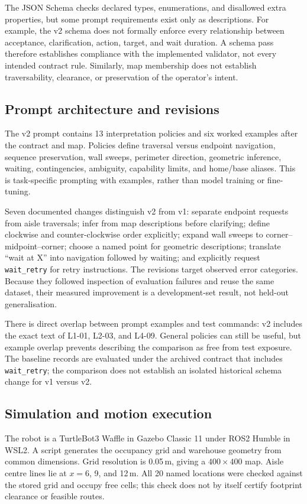 \documentclass[journal]{IEEEtran}
\newcommand{\field}[1]{\texttt{#1}}
\begin{document}
The JSON Schema checks declared types, enumerations, and disallowed extra properties, but some prompt requirements exist only as descriptions. For example, the v2 schema does not formally enforce every relationship between acceptance, clarification, action, target, and wait duration. A schema pass therefore establishes compliance with the implemented validator, not every intended contract rule. Similarly, map membership does not establish traversability, clearance, or preservation of the operator's intent.

\subsection{Prompt architecture and revisions}
The v2 prompt contains 13 interpretation policies and six worked examples after the contract and map. Policies define traversal versus endpoint navigation, sequence preservation, wall sweeps, perimeter direction, geometric inference, waiting, contingencies, ambiguity, capability limits, and home/base aliases. This is task-specific prompting with examples, rather than model training or fine-tuning.

Seven documented changes distinguish v2 from v1: separate endpoint requests from aisle traversals; infer from map descriptions before clarifying; define clockwise and counter-clockwise order explicitly; expand wall sweeps to corner--midpoint--corner; choose a named point for geometric descriptions; translate ``wait at X'' into navigation followed by waiting; and explicitly request \field{wait\_retry} for retry instructions. The revisions target observed error categories. Because they followed inspection of evaluation failures and reuse the same dataset, their measured improvement is a development-set result, not held-out generalisation.

There is direct overlap between prompt examples and test commands: v2 includes the exact text of L1-01, L2-03, and L4-09. General policies can still be useful, but example overlap prevents describing the comparison as free from test exposure. The baseline records are evaluated under the archived contract that includes \field{wait\_retry}; the comparison does not establish an isolated historical schema change for v1 versus v2.

\subsection{Simulation and motion execution}
The robot is a TurtleBot3 Waffle in Gazebo Classic 11 under ROS2 Humble in WSL2. A script generates the occupancy grid and warehouse geometry from common dimensions. Grid resolution is 0.05\,m, giving a $400\times400$ map. Aisle centre lines lie at $x=6$, 9, and 12\,m. All 20 named locations were checked against the stored grid and occupy free cells; this check does not by itself certify footprint clearance or feasible routes.
\end{document}
